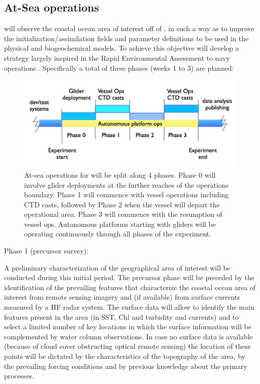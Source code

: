   
\subsection{At-Sea operations}

\proj will observe the coastal ocean area of interest off of \naz, in
such a way as to improve the initialization/assimilation fields and
parameter definitions to be used in the physical and biogeochemical
models. To achieve this objective \proj will develop a strategy largely
inspired in the Rapid Environmental Assessment to navy operations
. Specifically a total of three phases (weeks 1 to 3) are
planned:


\begin{figure}
  \centering
  \includegraphics[scale=0.22]{fig/timelines.jpg}
  \caption{At-sea operations for \proj will be split along 4 phases.
    Phase 0 will involve glider deployments at the further reaches of
    the operations boundary. Phase 1 will commence with vessel
    operations including CTD casts, followed by Phase 2 when the vessel
    will depart the \naz operational area. Phase 3 will commence with
    the resumption of vessel ops. Autonomous platforms starting with
    gliders will be operating continuously through all phases of the
    experiment.}
 \label{fig:expt-phases}
\end{figure}

 
Phase 1 (precursor survey):
 
A preliminary characterization of the geographical area of interest will
be conducted during this initial period. The precursor phase will be
preceded by the identification of the prevailing features that
characterize the coastal ocean area of interest from remote sensing
imagery and (if available) from surface currents measured by a HF radar
system. The surface data will allow to identify the main features
present in the area (in SST, Chl and turbidity and currents) and to
select a limited number of key locations in which the surface
information will be complemented by water column observations. In case
no surface data is available (because of cloud cover obstructing optical
remote sensing) the location of these points will be dictated by the
characteristics of the topography of the area, by the prevailing forcing
conditions and by previous knowledge about the primary processes.
 

